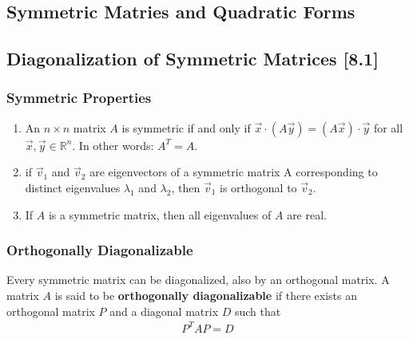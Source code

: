 \documentclass[a4paper,9pt]{extarticle}
\begin{document}
\begin{multicols*}{2}

\section{Symmetric Matries and Quadratic Forms}


\subsection{Diagonalization of Symmetric Matrices [8.1]}


\subsubsection{Symmetric Properties}
\begin{enumerate}[label=\bfseries (\arabic*)] \itemsep0pt \parskip0pt
    \item An $n \times n$ matrix $A$ is symmetric if and only if $\vec{x} \cdot (A \vec{y}) = (A \vec{x}) \cdot \vec{y}$ for all $\vec{x}, \vec{y} \in \mathbb{R}^n$. In other words: $A^T = A$.
    \item if $\vec{v}_1$ and $\vec{v}_2$ are eigenvectors of a symmetric matrix A corresponding to distinct eigenvalues $\lambda_1$ and $\lambda_2$, then $\vec{v}_1$ is orthogonal to $\vec{v}_2$.
    \item If $A$ is a symmetric matrix, then all eigenvalues of $A$ are real.
\end{enumerate}


\subsubsection{Orthogonally Diagonalizable}
Every symmetric matrix can be diagonalized, also by an orthogonal matrix. A matrix $A$ is said to be \textbf{orthogonally diagonalizable} if there exists an orthogonal matrix $P$ and a diagonal matrix $D$ such that
\begin{equation} \label{8.1-1}
    \begin{split}
        P^T A P = D
    \end{split}
\end{equation}


\end{multicols*}
\end{document}
